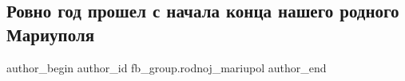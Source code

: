  
 
 
 
 
 
\subsection{Ровно год прошел с начала конца нашего родного Мариуполя}
\label{sec:24_02_2023.fb.fb_group.rodnoj_mariupol.1.nachalo_konca}
 
\ifcmt
 author_begin
   author_id fb_group.rodnoj_mariupol
 author_end
\fi
